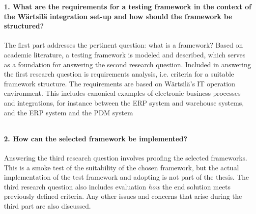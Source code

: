 \documentclass[12pt,a4paper,oneside,pdftex]{report}
\begin{document}
\begin{adjustwidth}{2.5em}{0pt}
\textbf{1. What are the requirements for a testing framework in the context of the W{\"a}rtsil{\"a} integration set-up and how should the framework be structured?} \\
\\
The first part addresses the pertinent question: what is a framework? Based on academic literature, a testing framework is modeled and described, which serves as a foundation for answering the second research question. Included in answering the first research question is requirements analysis, i.e. criteria for a suitable framework structure. The requirements are based on W{\"a}rtsil{\"a}'s IT operation environment. This includes canonical examples of electronic business processes and integrations, for instance between the ERP system and warehouse systems, and the ERP system and the PDM system \\
\\
\begin{comment}
\textbf{2. Which is the best integration testing framework in of the requirements among a limited set of alternatives?} \\
\\
Promising framework alternatives are listed after which, based on the requirements, a shortlist is composed. The purpose is not to go arduously through every available tool and painstakingly analyze and quantify their potential, but by quick assessment determine a set of alternatives that are easy to use and fit the framework, then offer a succinct comparison. Included in the second research question is requirements analysis, i.e. criteria for suitable framework technologies. A group of selected technologies satisfying the defined framework requirements will constitute a proof of concept experiment. \\
\\
\end{comment}
\textbf{2. How can the selected framework be implemented?} \\
\\
Answering the third research question involves proofing the selected frameworks. This is a smoke test of the suitability of the chosen framework, but the actual implementation of the test framework and adopting is not part of the thesis. The third research question also includes evaluation \emph{how} the end solution meets previously defined criteria. Any other issues and concerns that arise during the third part are also discussed. \\
\end{adjustwidth}
\end{document}
